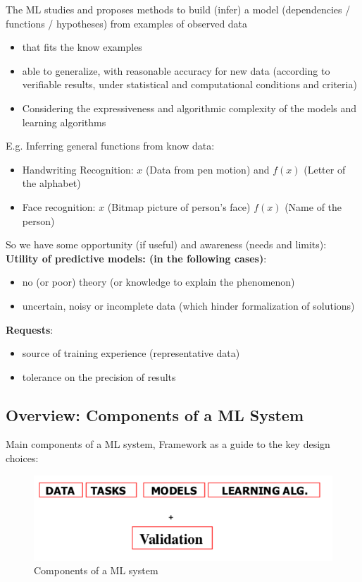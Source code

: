 \documentclass[../main.tex]{subfiles}
\begin{document}
The ML studies and proposes methods to build (infer) a model (dependencies / functions / hypotheses) from examples of observed data
\begin{itemize}
    \item that fits the know examples
    \item able to generalize, with reasonable accuracy for new data (according to verifiable results, under statistical and computational conditions and criteria)
    \item Considering the expressiveness and algorithmic complexity of the models and learning algorithms
\end{itemize}
E.g. Inferring general functions from know data:
\begin{itemize}
    \item Handwriting Recognition: $x$ (Data from pen motion) and $f(x)$ (Letter of the alphabet)
    \item Face recognition: $x$ (Bitmap picture of person's face) $f(x)$ (Name of the person)
\end{itemize}
So we have some opportunity (if useful) and awareness (needs and limits):\\

\textbf{Utility of predictive models: (in the following cases)}:
\begin{itemize}
    \item no (or poor) theory (or knowledge to explain the phenomenon)
    \item uncertain, noisy or incomplete data (which hinder formalization of solutions)
\end{itemize}

\textbf{Requests}:
\begin{itemize}
    \item source of training experience (representative data)
    \item tolerance on the precision of results
\end{itemize}

\subsection{Overview: Components of a ML System}
Main components of a ML system, Framework as a guide to the key design choices:
 
\begin{figure}[h!]
\centering
\includegraphics[scale=0.3]{lectures/1_Introduction/comp.png}
\caption{Components of a ML system}
\label{fig:MLComponents}
\end{figure}
\end{document}
